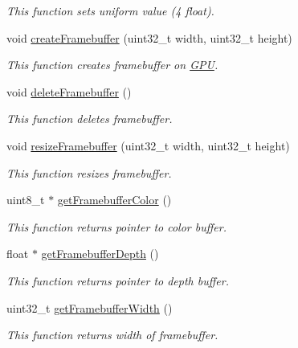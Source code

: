 \begin{DoxyCompactItemize}
\begin{DoxyCompactList}\small\item\em This function sets uniform value (4 float). \end{DoxyCompactList}\item 
void \hyperlink{group__framebuffer__tasks_gab041c171fc07011d13ec608fc94a1d1c}{create\+Framebuffer} (uint32\+\_\+t width, uint32\+\_\+t height)
\begin{DoxyCompactList}\small\item\em This function creates framebuffer on \hyperlink{classGPU}{G\+PU}. \end{DoxyCompactList}\item 
void \hyperlink{group__framebuffer__tasks_gaaaa9fbf5f3c28f27f092c2c6883d6e60}{delete\+Framebuffer} ()
\begin{DoxyCompactList}\small\item\em This function deletes framebuffer. \end{DoxyCompactList}\item 
void \hyperlink{group__framebuffer__tasks_ga6391eaf70194c39bf523ddc875ca176d}{resize\+Framebuffer} (uint32\+\_\+t width, uint32\+\_\+t height)
\begin{DoxyCompactList}\small\item\em This function resizes framebuffer. \end{DoxyCompactList}\item 
uint8\+\_\+t $\ast$ \hyperlink{group__framebuffer__tasks_ga67504b8136ef6283ad6efbb5323a0ef8}{get\+Framebuffer\+Color} ()
\begin{DoxyCompactList}\small\item\em This function returns pointer to color buffer. \end{DoxyCompactList}\item 
float $\ast$ \hyperlink{group__framebuffer__tasks_gab755d51ff9686df1fb9b2892b9861c1d}{get\+Framebuffer\+Depth} ()
\begin{DoxyCompactList}\small\item\em This function returns pointer to depth buffer. \end{DoxyCompactList}\item 
uint32\+\_\+t \hyperlink{group__framebuffer__tasks_ga467b565d440e5742b7ebc104a2d70ce3}{get\+Framebuffer\+Width} ()
\begin{DoxyCompactList}\small\item\em This function returns width of framebuffer. \end{DoxyCompactList}\item 

\end{DoxyCompactItemize}
